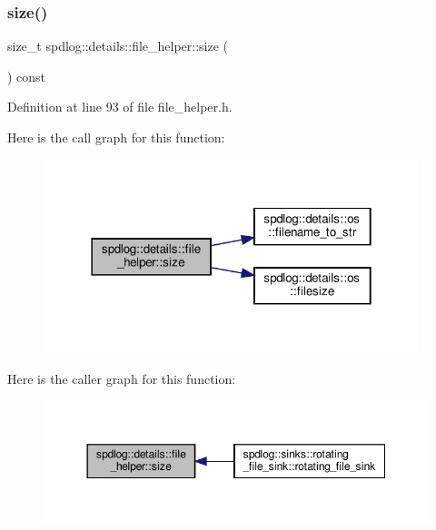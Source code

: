 \subsubsection{\texorpdfstring{size()}{size()}}
{\footnotesize\ttfamily size\+\_\+t spdlog\+::details\+::file\+\_\+helper\+::size (\begin{DoxyParamCaption}{ }\end{DoxyParamCaption}) const\hspace{0.3cm}{\ttfamily [inline]}}



Definition at line 93 of file file\+\_\+helper.\+h.

Here is the call graph for this function\+:
\nopagebreak
\begin{figure}[H]
\begin{center}
\leavevmode
\includegraphics[width=310pt]{classspdlog_1_1details_1_1file__helper_ae945d9701134218c2d0558958e9d1cf2_cgraph}
\end{center}
\end{figure}
Here is the caller graph for this function\+:
\nopagebreak
\begin{figure}[H]
\begin{center}
\leavevmode
\includegraphics[width=350pt]{classspdlog_1_1details_1_1file__helper_ae945d9701134218c2d0558958e9d1cf2_icgraph}
\end{center}
\end{figure}
\mbox{\label{classspdlog_1_1details_1_1file__helper_a28d87e3f42c52a12c95af0558aca66f2}} 
